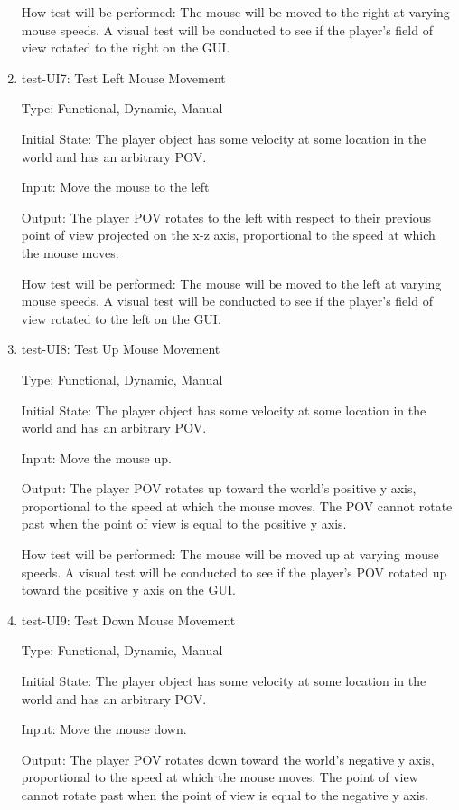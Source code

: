 \documentclass[12pt, titlepage]{article}
\begin{document}
\begin{enumerate}
How test will be performed: The mouse will be moved to the right at varying mouse speeds. A visual test will be conducted to see if the player's field of view rotated to the right on the GUI.

\item{test-UI7: Test Left Mouse Movement \\}

Type: Functional, Dynamic, Manual
					
Initial State: The player object has some velocity at some location in the world and has an arbitrary POV.
					
Input: Move the mouse to the left
					
Output: The player POV rotates to the left with respect to their previous point of view projected on the x-z axis, proportional to the speed at which the mouse moves.
					
How test will be performed: The mouse will be moved to the left at varying mouse speeds. A visual test will be conducted to see if the player's field of view rotated to the left on the GUI.

\item{test-UI8: Test Up Mouse Movement \\}

Type: Functional, Dynamic, Manual
					
Initial State: The player object has some velocity at some location in the world and has an arbitrary POV.
					
Input: Move the mouse up.
					
Output: The player POV rotates up toward the world's positive y axis, proportional to the speed at which the mouse moves. The POV cannot rotate past when the point of view is equal to the positive y axis.
					
How test will be performed: The mouse will be moved up at varying mouse speeds. A visual test will be conducted to see if the player's POV rotated up toward the positive y axis on the GUI.

\item{test-UI9: Test Down Mouse Movement \\}

Type: Functional, Dynamic, Manual
					
Initial State: The player object has some velocity at some location in the world and has an arbitrary POV.
					
Input: Move the mouse down.
					
Output: The player POV rotates down toward the world's negative y axis, proportional to the speed at which the mouse moves. The point of view cannot rotate past when the point of view is equal to the negative y axis.
					

\end{enumerate}
\end{document}
